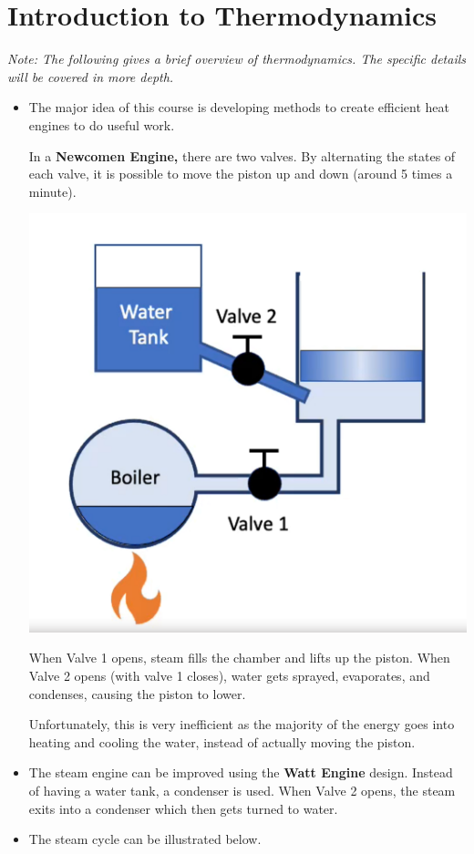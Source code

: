 \section{Introduction to Thermodynamics}
\textit{Note: The following gives a brief overview of thermodynamics. The specific details will be covered in more depth.}
\begin{itemize}
    \item The major idea of this course is developing methods to create efficient heat engines to do useful work.
          \begin{example}
              In a \textbf{Newcomen Engine,} there are two valves. By alternating the states of each valve, it is possible to move the piston up and down (around 5 times a minute).
              \begin{center}
                  \includegraphics[width=0.4\linewidth]{L01-Newcomen.png}
              \end{center}
              When Valve 1 opens, steam fills the chamber and lifts up the piston. When Valve 2 opens (with valve 1 closes), water gets sprayed, evaporates, and condenses, causing the piston to lower.
              \vspace{2mm}

              Unfortunately, this is very inefficient as the majority of the energy goes into heating and cooling the water, instead of actually moving the piston.
          \end{example}
    \item The steam engine can be improved using the \textbf{Watt Engine} design. Instead of having a water tank, a condenser is used. When Valve 2 opens, the steam exits into a condenser which then gets turned to water.
    \item The steam cycle can be illustrated below.
          \begin{center}
\end{center}
\end{itemize}
